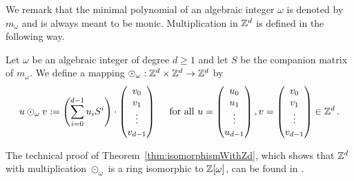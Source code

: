 We remark that the minimal polynomial of an algebraic integer $\omega$ is denoted by $m_\omega$ and is always meant to be monic.  
Multiplication in $\mathbb{Z}^d$ is defined in the following way.
\begin{defn}
Let $\omega$ be an algebraic integer of degree $d\geq 1$ and let $S$ be the companion matrix of $m_\omega$. We define a mapping $\odot_\omega: \mathbb{Z}^d \times \mathbb{Z}^d \rightarrow \mathbb{Z}^d$ by 
$$
u \odot_\omega v := \left(\sum_{i=0}^{d-1} {u}_i S^i\right)\cdot \begin{pmatrix} {v}_0 \\ {v}_1 \\ \vdots \\ {v}_{d-1} \end{pmatrix} \quad \text{ for all } u=\begin{pmatrix} {u}_0 \\ {u}_1 \\ \vdots \\ {u}_{d-1} \end{pmatrix}, v=\begin{pmatrix} {v}_0 \\ {v}_1 \\ \vdots \\ {v}_{d-1} \end{pmatrix} \in \mathbb{Z}^d\,.
$$ 
\end{defn}

The technical proof of Theorem~\ref{thm:isomorphismWithZd}, which shows that $\mathbb{Z}^d$ with multiplication $\odot_\omega$ is a ring isomorphic to $\mathbb{Z}[\omega]$, can be found in \cite{vu}.


